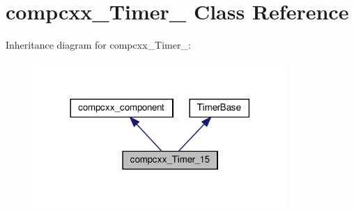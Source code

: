 \hypertarget{classcompcxx__Timer__15}{}\section{compcxx\+\_\+\+Timer\+\_ Class Reference}
\label{classcompcxx__Timer__15}


Inheritance diagram for compcxx\+\_\+\+Timer\+\_\+:\nopagebreak
\begin{figure}[H]
\begin{center}
\leavevmode
\includegraphics[width=272pt]{classcompcxx__Timer__15__inherit__graph}
\end{center}
\end{figure}


